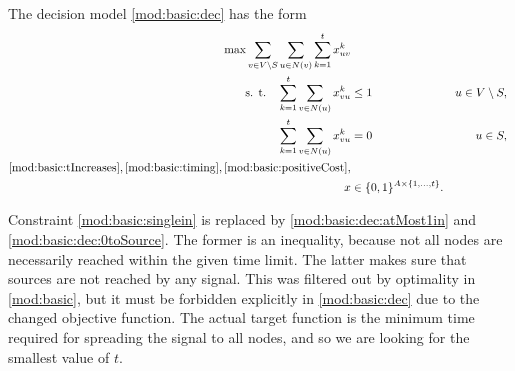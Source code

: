 The decision model \ref{mod:basic:dec}  has the form
\begin{subequations}\label{mod:basic:dec}
\begin{align}
\label{mod:basic:dec:obj} \max \sum\limits_{v \in V\setminus S}\sum\limits_{u \in N(v)} \sum\limits_{k=1}^{t}x_{uv}^k \\ 
\text{s. t.~~~} \label{mod:basic:dec:atMost1in} \sum\limits_{k=1}^{t}\sum\limits_{v\in N(u)}x_{vu}^k & \leq 1 & u\in V \setminus S,\\
\label{mod:basic:dec:0toSource} \sum\limits_{k=1}^{t}\sum\limits_{v\in N(u)}x_{vu}^k & = 0  & u\in S,\\
\eqref{mod:basic:tIncreases},\notag \eqref{mod:basic:timing},  \eqref{mod:basic:positiveCost},\\
\label{mod:basic:dec:dim}x &\in \{0,1\}^{A\times \{1,\dots,t\}}.&
\end{align}~
\end{subequations}

Constraint \eqref{mod:basic:singlein} is replaced by \eqref{mod:basic:dec:atMost1in} and \eqref{mod:basic:dec:0toSource}. 
The former is an inequality, because not all nodes are necessarily reached within the given time limit.
The latter makes sure that sources are not reached by any signal. 
This was filtered out by optimality in \eqref{mod:basic}, but it must be forbidden explicitly in \eqref{mod:basic:dec} due to the changed objective function.
The actual target function is the minimum time required for spreading the signal to all nodes, and so we are looking for the smallest value of $t$.

